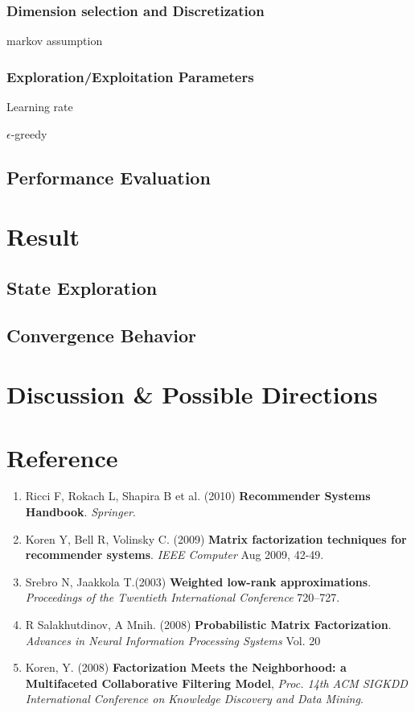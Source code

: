 \documentclass[11pt]{article}
\theoremstyle{definition}
\begin{document}
\subsubsection{Dimension selection and Discretization}
markov assumption



\subsubsection{Exploration/Exploitation Parameters}


Learning rate

$\epsilon$-greedy

\subsection{\textbf{Performance Evaluation}}


\section{\textbf{Result}}

\subsection{\textbf{State Exploration}}

\subsection{\textbf{Convergence Behavior}}


\section{\textbf{Discussion \& Possible Directions}}


\newpage
\section*{\textbf{Reference}}
\begin{enumerate}
\item \label{ref:handbook}
Ricci F, Rokach L, Shapira B et al. (2010) \textbf{Recommender Systems Handbook}. \textit{Springer}. 
\item \label{ref:MFieee}
Koren Y, Bell R, Volinsky C. (2009) \textbf{Matrix factorization techniques for recommender systems}. \textit{IEEE Computer} Aug 2009, 42-49. 
\item \label{ref:WLA}
Srebro N,  Jaakkola T.(2003) \textbf{Weighted low-rank approximations}. \textit{Proceedings of the Twentieth International Conference} 720–727.
\item \label{ref:PMF}
R Salakhutdinov, A Mnih. (2008) \textbf{Probabilistic Matrix Factorization}. \textit{Advances in Neural Information Processing Systems} Vol. 20

\item \label{ref:implicit}
Koren, Y. (2008) \textbf{Factorization Meets the Neighborhood: a Multifaceted Collaborative Filtering Model}, \textit{Proc. 14th ACM SIGKDD International Conference on Knowledge Discovery and
Data Mining}.

\end{enumerate}
\end{document}
